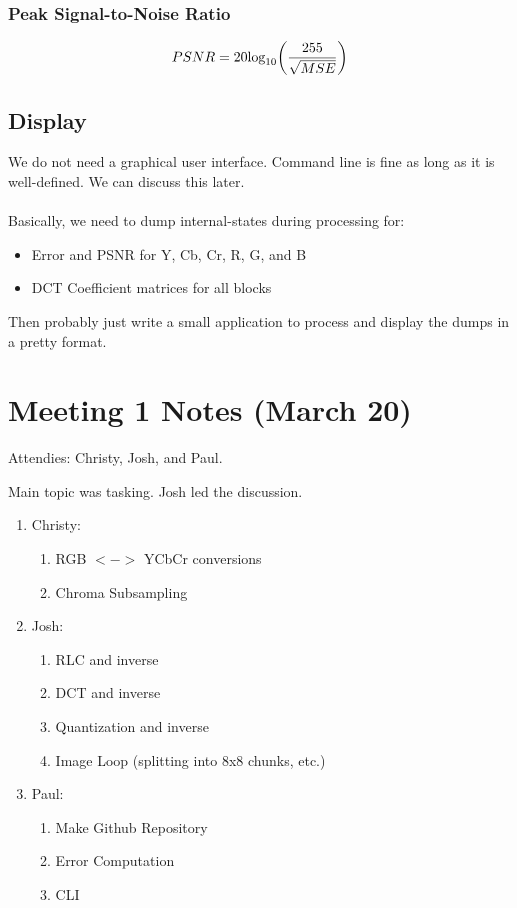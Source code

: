 \documentclass{article}
\begin{document}
\subsubsection{Peak Signal-to-Noise Ratio}
\[
PSNR = 20 \text{log}_{10}\bigg{(}\frac{255}{\sqrt{MSE}}\bigg{)}
\]

\subsection{Display}

We do not need a graphical user interface.
Command line is fine as long as it is well-defined.  We can discuss this later.
\\\\
Basically, we need to dump internal-states during processing for:
\begin{itemize}
\item Error and PSNR for Y, Cb, Cr, R, G, and B
\item DCT Coefficient matrices for all blocks
\end{itemize}

\noindent
Then probably just write a small application to process and display the dumps
in a pretty format.

\section{Meeting 1 Notes (March 20)}

\noindent
Attendies: Christy, Josh, and Paul.


\noindent
Main topic was tasking.  Josh led the discussion.
\begin{enumerate}
\item Christy:
\begin{enumerate}
\item RGB $<->$ YCbCr conversions
\item Chroma Subsampling
\end{enumerate}
\item Josh:
\begin{enumerate}
\item RLC and inverse
\item DCT and inverse
\item Quantization and inverse
\item Image Loop (splitting into 8x8 chunks, etc.)
\end{enumerate}
\item Paul:
\begin{enumerate}
\item Make Github Repository
\item Error Computation
\item CLI
\end{enumerate}
\end{enumerate}
\end{document}
